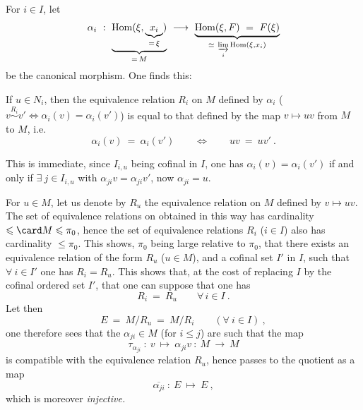 For $i \in I$, let
\[
\alpha_i \ : \ \underbrace{\mathrm{Hom}(\xi, \underbrace{x_i}_{=\,\xi})}_{=\,M} \ \longrightarrow \ \underbrace{\mathrm{Hom}(\xi,F) \ = \ F(\xi)}_{\simeq\ \varinjlim\limits_{i} \mathrm{Hom}(\xi,x_i)}
\]
be the canonical morphism. One finds this:
\begin{center}
%
\begin{minipage}[c]{0.78\linewidth}
If $u \in N_i$, then the equivalence relation $R_i$ on $M$ defined by $\alpha_i$ ($v \overset{R_i}{\sim} v' \Longleftrightarrow \alpha_i(v) = \alpha_i(v')$) is equal to that defined by the map $v \longmapsto uv$ from $M$ to $M$, i.e.
\[
\alpha_i(v) \ = \ \alpha_i(v') \qquad \Longleftrightarrow \qquad uv \ = \ uv' \ .
\]
\end{minipage}
\end{center}

This is immediate, since $I_{i,u}$ being cofinal in $I$, one has $\alpha_i(v) = \alpha_i(v')$ if and only if $\exists\ j \in I_{i,u}$ with $\alpha_{ji}v = \alpha_{ji}v'$, now $\alpha_{ji} = u$. %

For $u \in M$, let us denote by $R_u$ the equivalence relation on $M$ defined by $v \longmapsto uv$. The set of equivalence relations on 
obtained in this way has cardinality $\leqslant \card M \leqslant \pi_0$, hence the set of equivalence relations $R_i$ ($i \in I$) also has cardinality $\leqslant \pi_0$. This shows, $\pi_0$ being large relative to $\pi_0$, that there exists an equivalence relation of the form $R_u$ ($u \in M$), and a cofinal set $I'$ in $I$, such that $\forall\ i \in I'$ one has $R_i = R_u$. This shows that, at the cost of replacing $I$ by the cofinal ordered set $I'$, that one can suppose that one has
\[
R_i \ = \ R_u \qquad \forall\, i \in I \ .
\tag*{(4.15.8.5)}
\]
Let then
\[
E \ = \ M/R_u \ = \ M/R_i \qquad (\forall\ i \in I) \ ,
\]
one therefore sees that the $\alpha_{ji} \in M$ (for $i \leqslant j$) are such that the map
\[
\tau_{\alpha_{ji}} \ : \ v \ \longmapsto \ \alpha_{ji}v \ : \ M \ \longrightarrow \ M
\]
is compatible with the equivalence relation $R_u$, hence passes to the quotient as a map
\[
\overline{\alpha_{ji}} \ : \ E \ \longmapsto \ E \ ,
\]
which is moreover \textit{injective.}

